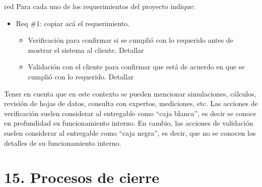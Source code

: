 \documentclass[
11pt, %
]{charter}
\begin{document}
\begin{consigna}{red}
Para cada uno de los requerimientos del proyecto indique:
\begin{itemize} 
\item Req \#1: copiar acá el requerimiento.

\begin{itemize}
	\item Verificación para confirmar si se cumplió con lo requerido antes de mostrar el sistema al cliente. Detallar 
	\item Validación con el cliente para confirmar que está de acuerdo en que se cumplió con lo requerido. Detallar  
\end{itemize}

\end{itemize}

Tener en cuenta que en este contexto se pueden mencionar simulaciones, cálculos, revisión de hojas de datos, consulta con expertos, mediciones, etc.  Las acciones de verificación suelen considerar al entregable como ``caja blanca'', es decir se conoce en profundidad su funcionamiento interno.  En cambio, las acciones de validación suelen considerar al entregable como ``caja negra'', es decir, que no se conocen los detalles de su funcionamiento interno.

\end{consigna}

\section{15. Procesos de cierre}    
\label{sec:cierre}
\end{document}
